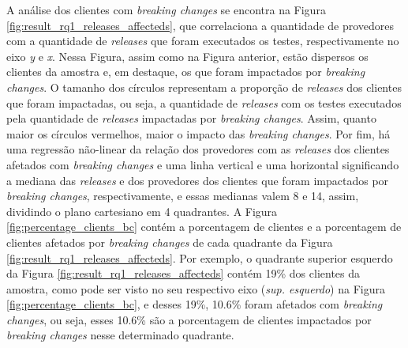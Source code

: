 A análise dos clientes com \textit{breaking changes} se encontra na Figura \ref{fig:result_rq1_releases_affecteds}, que correlaciona a quantidade de provedores com a quantidade de \textit{releases} que foram executados os testes, respectivamente no eixo \textit{y} e \textit{x}. Nessa Figura, assim como na Figura anterior, estão dispersos os clientes da amostra e, em destaque, os que foram impactados por \textit{breaking changes}. O tamanho dos círculos  representam a proporção de \textit{releases} dos clientes que foram impactadas, ou seja, a quantidade de \textit{releases} com os testes executados pela quantidade de \textit{releases} impactadas por \textit{breaking changes}. Assim, quanto maior os círculos vermelhos, maior o impacto das \textit{breaking changes}. Por fim, há uma regressão não-linear da relação dos provedores com as \textit{releases} dos clientes afetados com \textit{breaking changes} e uma linha vertical e uma horizontal significando a mediana das \textit{releases} e dos provedores dos clientes que foram impactados por \textit{breaking changes}, respectivamente, e essas medianas valem 8 e 14, assim, dividindo o plano cartesiano em 4 quadrantes. A Figura \ref{fig:percentage_clients_bc} contém a porcentagem de clientes e a porcentagem de clientes afetados por \textit{breaking changes} de cada quadrante da Figura \ref{fig:result_rq1_releases_affecteds}. Por exemplo, o quadrante superior esquerdo da Figura \ref{fig:result_rq1_releases_affecteds} contém 19\% dos clientes da amostra, como pode ser visto no seu respectivo eixo (\textit{sup. esquerdo}) na Figura \ref{fig:percentage_clients_bc}, e desses 19\%, 10.6\% foram afetados com \textit{breaking changes}, ou seja, esses 10.6\% são a porcentagem de clientes impactados por \textit{breaking changes} nesse determinado quadrante.

